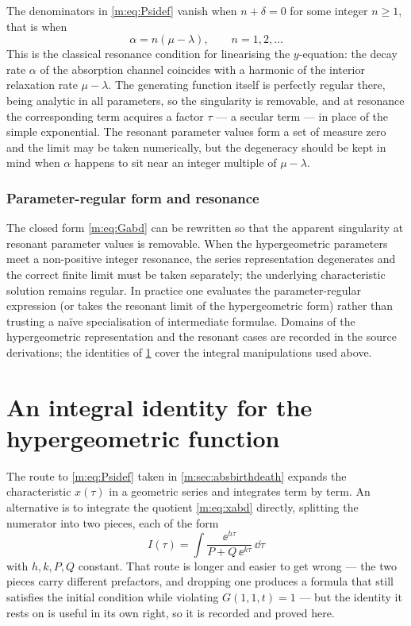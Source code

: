 \begin{remark}[Resonance]
\label{m:rem:resonance}
The denominators in \cref{m:eq:Psidef} vanish when $n+\delta=0$ for some integer
$n\ge1$, that is when
\begin{equation*}
\alpha = n(\mu-\lambda),\qquad n=1,2,\dots
\end{equation*}
This is the classical resonance condition for linearising the $y$-equation: the
decay rate $\alpha$ of the absorption channel coincides with a harmonic of the
interior relaxation rate $\mu-\lambda$. The generating function itself is perfectly
regular there, being analytic in all parameters, so the singularity is removable,
and at resonance the corresponding term acquires a factor $\tau$ --- a secular term
--- in place of the simple exponential. The resonant parameter values form a set of
measure zero and the limit may be taken numerically, but the degeneracy should be
kept in mind when $\alpha$ happens to sit near an integer multiple of $\mu-\lambda$.
\end{remark}


\subsubsection*{Parameter-regular form and resonance}
\label{m:sec:moc-resonance}

The closed form \cref{m:eq:Gabd} can be rewritten so that the apparent singularity
at resonant parameter values is removable. When the hypergeometric parameters meet
a non-positive integer resonance, the series representation degenerates and the
correct finite limit must be taken separately; the underlying characteristic
solution remains regular. In practice one evaluates the parameter-regular
expression (or takes the resonant limit of the hypergeometric form) rather than
trusting a na\"ive specialisation of intermediate formulae. Domains of the
hypergeometric representation and the resonant cases are recorded in the source
derivations; the identities of \cref{m:app:hyp} cover the integral manipulations
used above.



\section{An integral identity for the hypergeometric function}
\label{m:app:hyp}

The route to \cref{m:eq:Psidef} taken in \cref{m:sec:absbirthdeath} expands the
characteristic $x(\tau)$ in a geometric series and integrates term by term. An
alternative is to integrate the quotient \cref{m:eq:xabd} directly, splitting the
numerator into two pieces, each of the form
\begin{equation}
\label{m:eq:Iform}
I(\tau) = \int\frac{\ee^{h\tau}}{P+Q\,\ee^{k\tau}}\,\dd\tau
\end{equation}
with $h,k,P,Q$ constant. That route is longer and easier to get wrong --- the two
pieces carry different prefactors, and dropping one produces a formula that still
satisfies the initial condition while violating $G(1,1,t)=1$ --- but the identity it
rests on is useful in its own right, so it is recorded and proved here.

